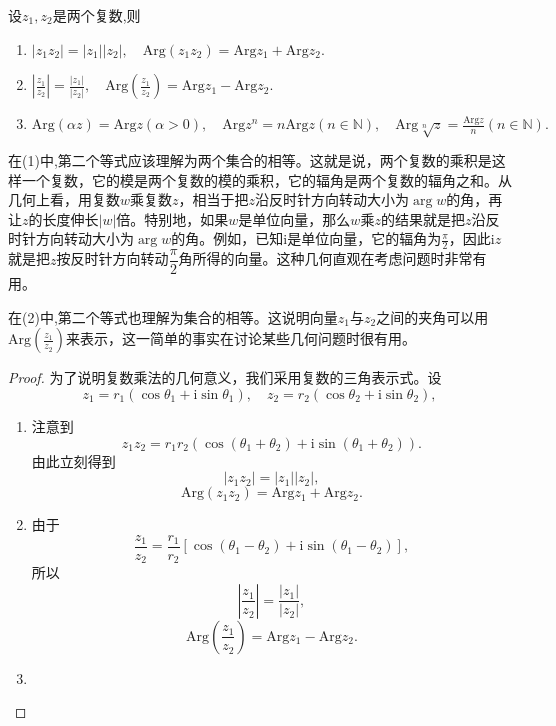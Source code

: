 \documentclass[../../main.tex]{subfiles}%
\begin{document}
\begin{theorem}\label{theorem:复数辐角的性质}
设$z_1,z_2$是两个复数,则
\begin{enumerate}[(1)]
\item $|z_1z_2| = |z_1||z_2|,\quad \mathrm{Arg}(z_1z_2) = \mathrm{Arg}z_1 + \mathrm{Arg}z_2.$

\item $\left| \frac{z_1}{z_2} \right| = \frac{|z_1|}{|z_2|},\quad 
\mathrm{Arg}\left( \frac{z_1}{z_2} \right) = \mathrm{Arg}z_1 - \mathrm{Arg}z_2.$

\item $\mathrm{Arg}\left( \alpha z \right) =\mathrm{Arg}z\left( \alpha >0 \right) ,\quad \mathrm{Arg}z^n=n\mathrm{Arg}z\left( n\in \mathbb{N} \right) ,\quad \mathrm{Arg}\sqrt[n]{z}=\frac{\mathrm{Arg}z}{n}\left( n\in \mathbb{N} \right).$
\end{enumerate}
\end{theorem}
\begin{note}
在(1)中,第二个等式应该理解为两个集合的相等。这就是说，两个复数的乘积是这样一个复数，它的模是两个复数的模的乘积，它的辐角是两个复数的辐角之和。从几何上看，用复数\(w\)乘复数\(z\)，相当于把\(z\)沿反时针方向转动大小为\(\arg w\)的角，再让\(z\)的长度伸长\(|w|\)倍。特别地，如果\(w\)是单位向量，那么\(w\)乘\(z\)的结果就是把\(z\)沿反时针方向转动大小为\(\arg w\)的角。例如，已知\(\mathrm{i}\)是单位向量，它的辐角为\(\frac{\pi}{2}\)，因此\(\mathrm{i}z\)就是把\(z\)按反时针方向转动\(\dfrac{\pi}{2}\)角所得的向量。这种几何直观在考虑问题时非常有用。

在(2)中,第二个等式也理解为集合的相等。这说明向量\(z_1\)与\(z_2\)之间的夹角可以用\(\mathrm{Arg}\left( \frac{z_1}{z_2} \right)\)来表示，这一简单的事实在讨论某些几何问题时很有用。
\end{note}
\begin{proof}

为了说明复数乘法的几何意义，我们采用复数的三角表示式。设
\[
z_1 = r_1(\cos\theta_1 + \mathrm{i}\sin\theta_1),
\quad
z_2 = r_2(\cos\theta_2 + \mathrm{i}\sin\theta_2),
\]
\begin{enumerate}[(1)]
\item 注意到
\[
z_1z_2 = r_1r_2(\cos(\theta_1 + \theta_2) + \mathrm{i}\sin(\theta_1 + \theta_2)).
\]
由此立刻得到
\[
|z_1z_2| = |z_1||z_2|,
\]
\[
\mathrm{Arg}(z_1z_2) = \mathrm{Arg}z_1 + \mathrm{Arg}z_2.
\]

\item 由于
\[
\frac{z_1}{z_2} = \frac{r_1}{r_2}[\cos(\theta_1 - \theta_2) + \mathrm{i}\sin(\theta_1 - \theta_2)],
\]
所以
\[
\left| \frac{z_1}{z_2} \right| = \frac{|z_1|}{|z_2|},
\]
\[
\mathrm{Arg}\left( \frac{z_1}{z_2} \right) = \mathrm{Arg}z_1 - \mathrm{Arg}z_2.
\]

\item 
\end{enumerate}

\end{proof}
\end{document}
